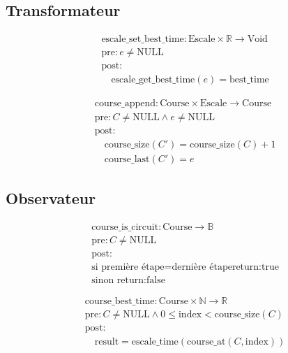 \subsection{Transformateur}

\[
\begin{aligned}
&\text{escale\_set\_best\_time}: \text{Escale} \times \mathbb{R} \to \text{Void} \\
&\text{pre}: e \neq \text{NULL} \\
&\text{post}: \\
&\quad \text{escale\_get\_best\_time}(e) = \text{best\_time}
\end{aligned}
\]

\[
\begin{aligned}
&\text{course\_append}: \text{Course} \times \text{Escale} \to \text{Course} \\
&\text{pre}: C \neq \text{NULL} \land e \neq \text{NULL} \\
&\text{post}: \\
&\quad \text{course\_size}(C') = \text{course\_size}(C) + 1 \\
&\quad \text{course\_last}(C') = e
\end{aligned}
\]


\subsection{Observateur}



\[
\begin{aligned}
&\text{course\_is\_circuit}: \text{Course} \to \mathbb{B} \\
&\text{pre}: C \neq \text{NULL} \\
&\text{post}: \\
&\text{si } \text{première étape} = \text{dernière étape} \text{return:true} \\
&\text{sinon return:false}
\end{aligned}
\]



\[
\begin{aligned}
&\text{course\_best\_time}: \text{Course} \times \mathbb{N} \to \mathbb{R} \\
&\text{pre}: C \neq \text{NULL} \land 0 \leq \text{index} < \text{course\_size}(C) \\
&\text{post}: \\
&\quad \text{result} = \text{escale\_time}(\text{course\_at}(C, \text{index}))
\end{aligned}
\]



